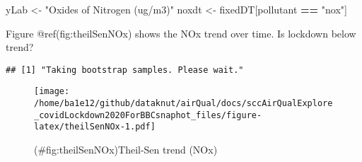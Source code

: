 \documentclass[]{article}
\newenvironment{Shaded}{\begin{snugshade}}{\end{snugshade}}
\newcommand{\KeywordTok}[1]{\textcolor[rgb]{0.13,0.29,0.53}{\textbf{#1}}}
\newcommand{\DataTypeTok}[1]{\textcolor[rgb]{0.13,0.29,0.53}{#1}}
\newcommand{\DecValTok}[1]{\textcolor[rgb]{0.00,0.00,0.81}{#1}}
\newcommand{\StringTok}[1]{\textcolor[rgb]{0.31,0.60,0.02}{#1}}
\newcommand{\CommentTok}[1]{\textcolor[rgb]{0.56,0.35,0.01}{\textit{#1}}}
\newcommand{\OtherTok}[1]{\textcolor[rgb]{0.56,0.35,0.01}{#1}}
\newcommand{\OperatorTok}[1]{\textcolor[rgb]{0.81,0.36,0.00}{\textbf{#1}}}
\newcommand{\NormalTok}[1]{#1}
\begin{document}
\begin{Shaded}
\begin{Highlighting}[]
\NormalTok{yLab <-}\StringTok{ "Oxides of Nitrogen (ug/m3)"}
\NormalTok{noxdt <-}\StringTok{ }\NormalTok{fixedDT[pollutant }\OperatorTok{==}\StringTok{ "nox"}\NormalTok{]}
\end{Highlighting}
\end{Shaded}

Figure @ref(fig:theilSenNOx) shows the NOx trend over time. Is lockdown
below trend?

\begin{Shaded}
\end{Shaded}

\begin{verbatim}
## [1] "Taking bootstrap samples. Please wait."
\end{verbatim}

\begin{figure}
\centering
\texttt{[image: /home/ba1e12/github/dataknut/airQual/docs/sccAirQualExplore\_covidLockdown2020ForBBCsnaphot\_files/figure-latex/theilSenNOx-1.pdf]}
\caption{(\#fig:theilSenNOx)Theil-Sen trend (NOx)}
\end{figure}
\end{document}

